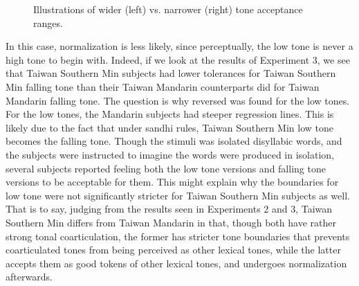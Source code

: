 \documentclass[12pt]{report}
\begin{document}
\begin{CJK}{UTF8}{bsmi}
\begin{figure}[hbt!]
\caption{Illustrations of wider (left) vs. narrower (right) tone acceptance ranges.}
\label{Figure:ToneAcceptanceIllustration}
\end{figure}
In this case, normalization is less likely, since perceptually, the low tone is never a high tone to begin with. Indeed, if we look at the results of Experiment 3, we see that Taiwan Southern Min subjects had lower tolerances for Taiwan Southern Min falling tone than their Taiwan Mandarin counterparts did for Taiwan Mandarin falling tone. The question is why reversed was found for the low tones. For the low tones, the Mandarin subjects had steeper regression lines. This is likely due to the fact that under sandhi rules, Taiwan Southern Min low tone becomes the falling tone. Though the stimuli was isolated disyllabic words, and the subjects were instructed to imagine the words were produced in isolation, several subjects reported feeling both the low tone versions and falling tone versions to be acceptable for them. This might explain why the boundaries for low tone were not significantly stricter for Taiwan Southern Min subjects as well. That is to say, judging from the results seen in Experiments 2 and 3, Taiwan Southern Min differs from Taiwan Mandarin in that, though both have rather strong tonal coarticulation, the former has stricter tone boundaries that prevents coarticulated tones from being perceived as other lexical tones, while the latter accepts them as good tokens of other lexical tones, and undergoes normalization afterwards.


\end{CJK}
\end{document}
